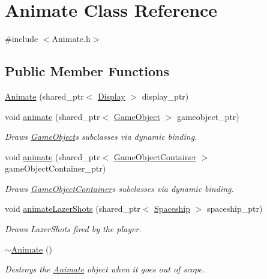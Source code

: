 \hypertarget{class_animate}{}\section{Animate Class Reference}
\label{class_animate}


{\ttfamily \#include $<$Animate.\+h$>$}

\subsection*{Public Member Functions}
\begin{DoxyCompactItemize}
\item 
\mbox{\hyperlink{class_animate_ac76ff6cc4d70ec93f9b93ccc5c843b48}{Animate}} (shared\+\_\+ptr$<$ \mbox{\hyperlink{class_display}{Display}} $>$ display\+\_\+ptr)
\item 
void \mbox{\hyperlink{class_animate_af57977742bd75111683827481af7ea2b}{animate}} (shared\+\_\+ptr$<$ \mbox{\hyperlink{class_game_object}{Game\+Object}} $>$ gameobject\+\_\+ptr)
\begin{DoxyCompactList}\small\item\em Draws \mbox{\hyperlink{class_game_object}{Game\+Object}}\textquotesingle{}s subclasses via dynamic binding. \end{DoxyCompactList}\item 
void \mbox{\hyperlink{class_animate_a0f4c6efcc45e4705691f99642a3232c1}{animate}} (shared\+\_\+ptr$<$ \mbox{\hyperlink{class_game_object_container}{Game\+Object\+Container}} $>$ game\+Object\+Container\+\_\+ptr)
\begin{DoxyCompactList}\small\item\em Draws \mbox{\hyperlink{class_game_object_container}{Game\+Object\+Container}}\textquotesingle{}s subclasses via dynamic binding. \end{DoxyCompactList}\item 
void \mbox{\hyperlink{class_animate_ac5b83e2b0dcf05902210071d7863272b}{animate\+Lazer\+Shots}} (shared\+\_\+ptr$<$ \mbox{\hyperlink{class_spaceship}{Spaceship}} $>$ spaceship\+\_\+ptr)
\begin{DoxyCompactList}\small\item\em Draws Lazer\+Shots fired by the player. \end{DoxyCompactList}\item 
\mbox{\label{class_animate_a5912d620540e37b206e6e4959391aaee}} 
\mbox{\hyperlink{class_animate_a5912d620540e37b206e6e4959391aaee}{$\sim$\+Animate}} ()
\begin{DoxyCompactList}\small\item\em Destroys the \mbox{\hyperlink{class_animate}{Animate}} object when it goes out of scope. \end{DoxyCompactList}\end{DoxyCompactItemize}
